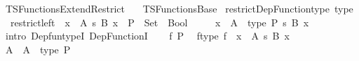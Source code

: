 %
\begin{isabellebody}%
%
%
\isadelimdocument
%
\endisadelimdocument
%
\isatagdocument
%
\isamarkuptrue%
%
\endisatagdocument
{\isafolddocument}%
%
\isadelimdocument
%
\endisadelimdocument
%
\isadelimtheory
%
\endisadelimtheory
%
\isatagtheory
{}\isamarkupfalse%
\ TSFunctions{\isacharunderscore}{\kern0pt}Extend{\isacharunderscore}{\kern0pt}Restrict\isanewline
\ \ \ TSFunctions{\isacharunderscore}{\kern0pt}Base\isanewline
{}%
\endisatagtheory
{\isafoldtheory}%
%
\isadelimtheory
\isanewline
%
\endisadelimtheory
\isanewline
{}\isamarkupfalse%
\ restrict{\isacharunderscore}{\kern0pt}Dep{\isacharunderscore}{\kern0pt}Function{\isacharunderscore}{\kern0pt}type\ {\isacharbrackleft}{\kern0pt}type{\isacharbrackright}{\kern0pt}{\isacharcolon}{\kern0pt}\isanewline
\ \ {\isachardoublequoteopen}restrict{\isacharunderscore}{\kern0pt}left\ {\isacharcolon}{\kern0pt}\ {\isacharparenleft}{\kern0pt}{\isacharparenleft}{\kern0pt}x\ {\isacharcolon}{\kern0pt}\ A{\isacharparenright}{\kern0pt}\ {\isasymrightarrow}s\ B\ x{\isacharparenright}{\kern0pt}\ {\isasymRightarrow}\ {\isacharparenleft}{\kern0pt}P\ {\isacharcolon}{\kern0pt}\ Set\ {\isasymRightarrow}\ Bool{\isacharparenright}{\kern0pt}\ {\isasymRightarrow}\isanewline
\ \ \ \ {\isacharparenleft}{\kern0pt}{\isacharparenleft}{\kern0pt}x\ {\isacharcolon}{\kern0pt}\ {\isacharparenleft}{\kern0pt}A\ {\isacharampersand}{\kern0pt}\ type\ P{\isacharparenright}{\kern0pt}{\isacharparenright}{\kern0pt}\ {\isasymrightarrow}s\ B\ x{\isacharparenright}{\kern0pt}\ {\isachardoublequoteclose}\isanewline
%
\isadelimproof
%
\endisadelimproof
%
\isatagproof
{}\isamarkupfalse%
\ {\isacharparenleft}{\kern0pt}intro\ Dep{\isacharunderscore}{\kern0pt}fun{\isacharunderscore}{\kern0pt}typeI\ Dep{\isacharunderscore}{\kern0pt}FunctionI{\isacharparenright}{\kern0pt}\isanewline
\ \ \isamarkupfalse%
\ f\ P\ \isamarkupfalse%
\ f{\isacharunderscore}{\kern0pt}type{\isacharcolon}{\kern0pt}\ {\isachardoublequoteopen}f\ {\isacharcolon}{\kern0pt}\ {\isacharparenleft}{\kern0pt}x\ {\isacharcolon}{\kern0pt}\ A{\isacharparenright}{\kern0pt}\ {\isasymrightarrow}s\ B\ x{\isachardoublequoteclose}\isanewline
\ \ \isamarkupfalse%
\ {\isacharquery}{\kern0pt}A{\isacharprime}{\kern0pt}\ {\isacharequal}{\kern0pt}\ {\isachardoublequoteopen}A\ {\isacharampersand}{\kern0pt}\ type\ P{\isachardoublequoteclose}\isanewline

\end{isabellebody}
